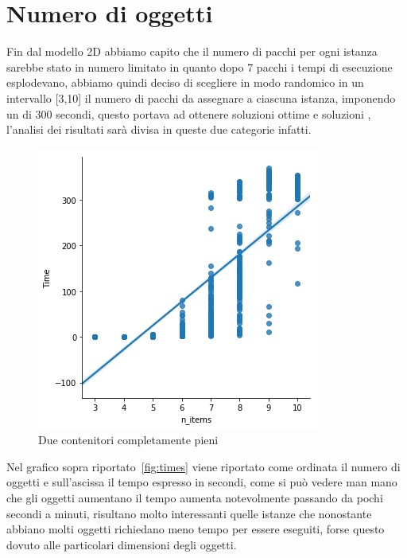 \section{Numero di oggetti}
Fin dal modello 2D abbiamo capito che il numero di pacchi per ogni istanza sarebbe stato in numero limitato in quanto dopo 7 pacchi i tempi di esecuzione esplodevano, abbiamo quindi deciso di scegliere in modo randomico in un intervallo [3,10] il numero di pacchi da assegnare a ciascuna istanza, imponendo un  di 300 secondi, questo portava ad ottenere soluzioni ottime e soluzioni , l'analisi dei risultati sarà divisa in queste due categorie infatti.

\begin{figure}[!ht]
	\begin{center} \includegraphics[scale=0.8]{figures/time_nitems}
		\caption[Bin packing figures]{Due contenitori completamente pieni}  
		\label{fig:times}
	\end{center}
\end{figure}

Nel grafico sopra riportato~\eqref{fig:times} viene riportato come ordinata il numero di oggetti e sull'ascissa il tempo espresso in secondi, come si può vedere man mano che gli oggetti aumentano il tempo aumenta notevolmente passando da pochi secondi a minuti, risultano molto interessanti quelle istanze che nonostante abbiano molti oggetti richiedano meno tempo per essere eseguiti, forse questo dovuto alle particolari dimensioni degli oggetti.

